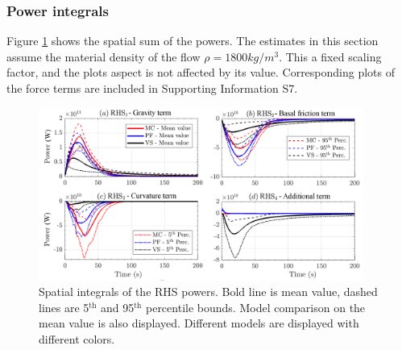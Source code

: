 \documentclass{article}
\begin{document}
\subsubsection{Power integrals}
Figure \ref{fig:Colima-Power-spatial} shows the spatial sum of the powers. The estimates in this section assume the material density of the flow $\rho = 1800 kg/m^3$. This a fixed scaling factor, and the plots aspect is not affected by its value. Corresponding plots of the force terms are included in Supporting Information S7.
\begin{figure}[H]
        \centering
        \includegraphics[width=0.95\textwidth]{BAF_VolcanDeColima/AveragedMeasurments/PowersColima.png}
        \caption{Spatial integrals of the RHS powers. Bold line is mean value, dashed lines are 5$^{\mathrm{th}}$ and 95$^{\mathrm{th}}$ percentile bounds. Model comparison on the mean value is also displayed. Different models are displayed with different colors.}
        \label{fig:Colima-Power-spatial}
\end{figure}
\end{document}
